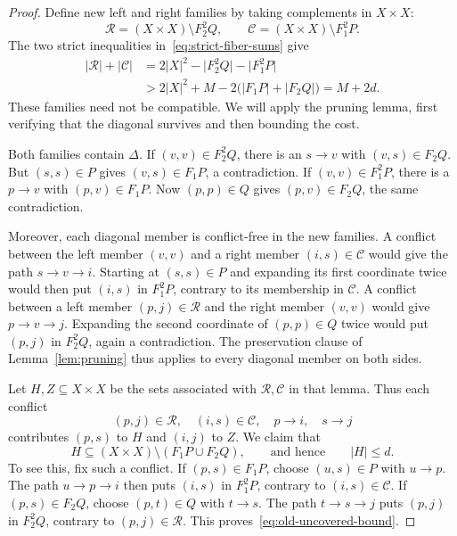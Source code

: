 \documentclass[11pt]{article}
\theoremstyle{remark}
\newcommand{\abs}[1]{\lvert #1\rvert}
\begin{document}
\begin{proof}
Define new left and right families by taking complements in $X\times X$:
\[
 \mathcal R=(X\times X)\setminus F_2^2Q,
 \qquad
 \mathcal C=(X\times X)\setminus F_1^2P.
\]
The two strict inequalities in~\eqref{eq:strict-fiber-sums} give
\begin{equation}\label{eq:complement-gain}
 \begin{aligned}
 \abs{\mathcal R}+\abs{\mathcal C}
 &=2\abs{X}^2-\abs{F_2^2Q}-\abs{F_1^2P}\\
 &>2\abs{X}^2+M-2\bigl(\abs{F_1P}+\abs{F_2Q}\bigr)
 =M+2d.
 \end{aligned}
\end{equation}
These families need not be compatible.  We will apply the pruning lemma,
first verifying that the diagonal survives and then bounding the cost.

Both families contain $\Delta$.  If $(v,v)\in F_2^2Q$, there is an $s\to v$
with $(v,s)\in F_2Q$.  But $(s,s)\in P$ gives $(v,s)\in F_1P$, a
contradiction.  If $(v,v)\in F_1^2P$, there is a $p\to v$ with
$(p,v)\in F_1P$.  Now $(p,p)\in Q$ gives $(p,v)\in F_2Q$, the same
contradiction.

Moreover, each diagonal member is conflict-free in the new families.
A conflict between the left member $(v,v)$ and a right member
$(i,s)\in\mathcal C$ would give the path $s\to v\to i$.
Starting at $(s,s)\in P$ and expanding its first coordinate twice would
then put $(i,s)$ in $F_1^2P$, contrary to its membership in $\mathcal C$.
A conflict between a left member $(p,j)\in\mathcal R$ and the right member
$(v,v)$ would give $p\to v\to j$.  Expanding the second coordinate of
$(p,p)\in Q$ twice would put $(p,j)$ in $F_2^2Q$, again a contradiction.
The preservation clause of Lemma~\ref{lem:pruning} thus applies to every
diagonal member on both sides.

Let $H,Z\subseteq X\times X$ be the sets associated with
$\mathcal R,\mathcal C$ in that lemma.  Thus each conflict
\[
 (p,j)\in\mathcal R,\quad (i,s)\in\mathcal C,\quad
 p\to i,\quad s\to j
\]
contributes $(p,s)$ to $H$ and $(i,j)$ to $Z$.
We claim that
\begin{equation}\label{eq:old-uncovered-bound}
 H\subseteq (X\times X)\setminus(F_1P\cup F_2Q),
 \qquad\text{and hence}\qquad \abs{H}\le d.
\end{equation}
To see this, fix such a conflict.  If $(p,s)\in F_1P$, choose
$(u,s)\in P$ with $u\to p$.  The path $u\to p\to i$ then puts
$(i,s)$ in $F_1^2P$, contrary to $(i,s)\in\mathcal C$.
If $(p,s)\in F_2Q$, choose $(p,t)\in Q$ with $t\to s$.
The path $t\to s\to j$ puts $(p,j)$ in $F_2^2Q$, contrary to
$(p,j)\in\mathcal R$.  This proves~\eqref{eq:old-uncovered-bound}.


\end{proof}
\end{document}
